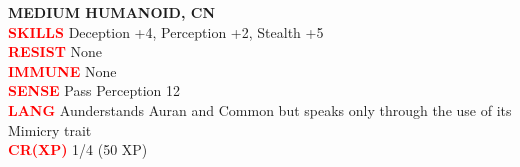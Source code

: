\documentclass{article}
\begin{document}
\begin{adjustbox}{minipage=0.45\textwidth, margin=\fboxsep, bgimage=../images/texture2.pdf}
{\begin{minipage}[t][10.5in][t]{0.9\textwidth}
\begin{flushleft}
            {\large\textbf{MEDIUM HUMANOID, CN}}\\
            \textcolor{red}{\textbf{SKILLS}} Deception +4, Perception +2, Stealth +5 \\
            \textcolor{red}{\textbf{RESIST}} None \\
            \textcolor{red}{\textbf{IMMUNE}} None\\
            \textcolor{red}{\textbf{SENSE}} Pass Perception 12\\
            \textcolor{red}{\textbf{LANG}} Aunderstands Auran and Common but speaks only through the use of its Mimicry trait\\
            \textcolor{red}{\textbf{CR(XP)}}  1/4 (50 XP)\\
        \end{flushleft}
        \end{minipage}
	}
\end{adjustbox}
\hspace{0.05\textwidth}
\end{document}
